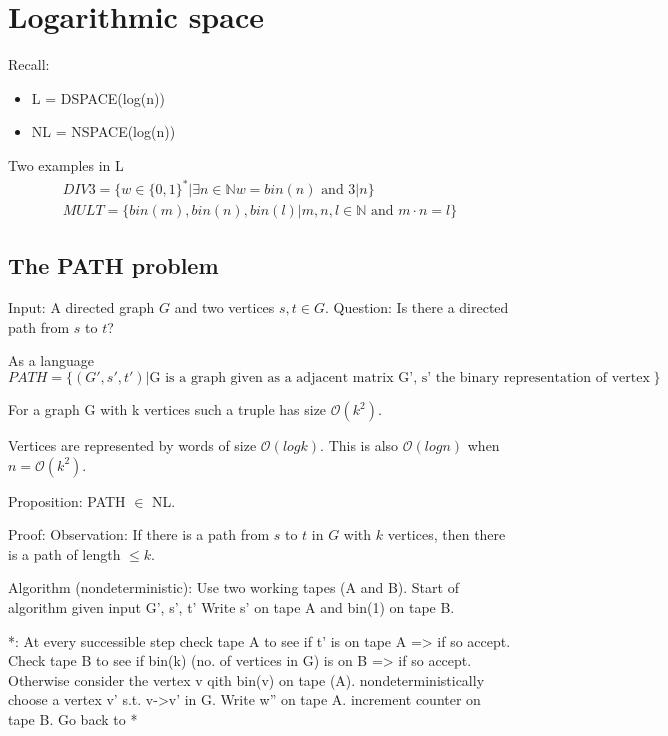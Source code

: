\documentclass[a4paper,12pt]{article}
\theoremstyle{definition}
\theoremstyle{remark}
\newcommand{\N}{\mathbb{N}}
\begin{document}






\newpage
\section{Logarithmic space}
Recall:
\begin{itemize}
    \item L = DSPACE(log(n))
    \item NL = NSPACE(log(n))
\end{itemize}

Two examples in L
\begin{gather*}
    DIV3 = \{w \in \{0, 1\}^* | \exists n \in \N w = bin(n) \text{ and } 3|n\} \\
    MULT = \{bin(m), bin(n), bin(l) | m, n, l \in \N \text{ and } m \cdot n = l\}
\end{gather*}

\subsection{The PATH problem}
Input: A directed graph $G$ and two vertices $s, t \in G$.
Question: Is there a directed path from $s$ to $t$?

As a language
\begin{equation*}
    PATH = \{(G', s', t') | \text{G is a graph given as a adjacent matrix G', s' the binary representation of vertex s, t' the binary representation of vertex t}\}
\end{equation*}

For a graph G with k vertices such a truple has size $\mathscr{O}(k^2)$.

Vertices are represented by words of size $\mathscr{O}(log k)$. This is also $\mathscr{O}(log n)$ when $n = \mathscr{O}(k^2)$.

Proposition: PATH $\in$ NL.

Proof: Observation: If there is a path from $s$ to $t$ in $G$ with $k$ vertices, then there is a path of length $ \leq k$.

Algorithm (nondeterministic):
Use two working tapes (A and B).
Start of algorithm given input G', s', t' 
Write s' on tape A and bin(1) on tape B.

*: At every successible step check tape A to see if t' is on tape A => if so accept.
Check tape B to see if bin(k) (no. of vertices in G) is on B => if so accept.
Otherwise consider the vertex v qith bin(v) on tape (A).
nondeterministically choose a vertex v' s.t. v->v' in G. Write w'' on tape A. increment counter on tape B. Go back to *
\end{document}
